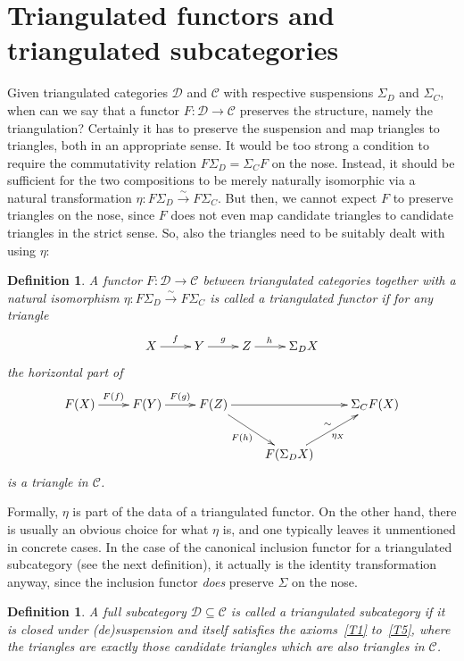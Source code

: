 \documentclass{amsproc}
\newtheorem{defn}[prop]{Definition}
\theoremstyle{definition}
\begin{document}
\section{Triangulated functors and triangulated subcategories}
\label{verdier}

Given triangulated categories ${\mathcal{D}}$ and ${\mathcal{C}}$ with respective suspensions $\Sigma_D$ and $\Sigma_C$, when can we say that a functor $F:{\mathcal{D}}{\longrightarrow}{\mathcal{C}}$ preserves the structure, namely the triangulation? Certainly it has to preserve the suspension and map triangles to triangles, both in an appropriate sense. It would be too strong a condition to require the commutativity relation $F\Sigma_D=\Sigma_C F$ on the nose. Instead, it should be sufficient for the two compositions to be merely naturally isomorphic via a natural transformation $\eta:F\Sigma_D\stackrel{\sim}{\longrightarrow} F\Sigma_C$. But then, we cannot expect $F$ to preserve triangles on the nose, since $F$ does not even map candidate triangles to candidate triangles in the strict sense. So, also the triangles need to be suitably dealt with using $\eta$:

\begin{defn}
A functor $F:{\mathcal{D}}{\longrightarrow}{\mathcal{C}}$ between triangulated categories together with a natural isomorphism $\eta:F\Sigma_D\stackrel{\sim}{\longrightarrow} F\Sigma_C$ is called a \emph{triangulated functor} if for any triangle
\begin{displaymath}
\xymatrix{X\ar[r]^f & Y\ar[r]^g & Z\ar[r]^(.4)h & {}\Sigma_DX}
\end{displaymath}
the horizontal part of
\begin{displaymath}
\xymatrix{F(X)\ar[r]^{F(f)} & F(Y)\ar[r]^{F(g)} & F(Z)\ar[rr]\ar[rd]_{F(h)} && {}\Sigma_CF(X)\\
&&&F(\Sigma_DX)\ar[ru]_{\eta_X}^\sim &}
\end{displaymath}
is a triangle in ${\mathcal{C}}$.
\end{defn}

Formally, $\eta$ is part of the data of a triangulated functor. On the other hand, there is usually an obvious choice for what $\eta$ is, and one typically leaves it unmentioned in concrete cases. In the case of the canonical inclusion functor for a triangulated subcategory (see the next definition), it actually is the identity transformation anyway, since the inclusion functor \emph{does} preserve $\Sigma$ on the nose.

\begin{defn}
\label{trisubcat}
A full subcategory ${\mathcal{D}}\subseteq{\mathcal{C}}$ is called a \emph{triangulated subcategory} if it is closed under (de)suspension and itself satisfies the axioms~\ref{T1} to~\ref{T5}, where the triangles are exactly those candidate triangles which are also triangles in ${\mathcal{C}}$.
\end{defn}
\end{document}
